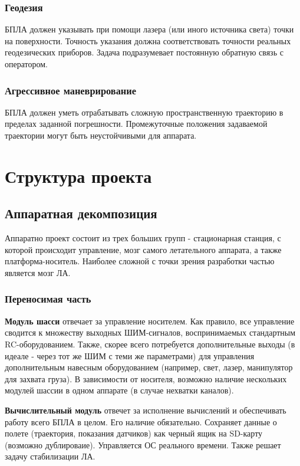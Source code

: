\documentclass[utf8]{report}
\begin{document}
\subsection{Геодезия}
БПЛА должен указывать при помощи лазера (или иного источника света) точки на поверхности. Точность указания должна соответствовать точности реальных геодезических приборов. Задача подразумевает постоянную обратную связь с оператором.

\subsection{Агрессивное маневрирование}
БПЛА должен уметь отрабатывать сложную пространственную траекторию в пределах заданной погрешности. Промежуточные положения задаваемой траектории могут быть неустойчивыми для аппарата.

\chapter{Структура проекта}

\section{Аппаратная декомпозиция}

Аппаратно проект состоит из трех больших групп - стационарная станция, с которой происходит управление, мозг самого летательного аппарата, а также платформа-носитель. Наиболее сложной с точки зрения разработки частью является мозг ЛА.

\subsection{Переносимая часть}

\textbf{Модуль шасси} отвечает за управление носителем. Как правило, все управление сводится к множеству выходных ШИМ-сигналов, воспринимаемых стандартным RC-оборудованием. Также, скорее всего потребуется дополнительные выходы (в идеале - через тот же ШИМ с теми же параметрами) для управления дополнительным навесным оборудованием (например, свет, лазер, манипулятор для захвата груза). В зависимости от носителя, возможно наличие нескольких модулей шассии в одном аппарате (в случае нехватки каналов).

\textbf{Вычислительный модуль} отвечет за исполнение вычислений и обеспечивать работу всего БПЛА в целом. Его наличие обязательно. Сохраняет данные о полете (траектория, показания датчиков) как черный ящик на SD-карту (возможно дублироваие). Управляется ОС реального времени. Также решает задачу стабилизации ЛА.
\end{document}
